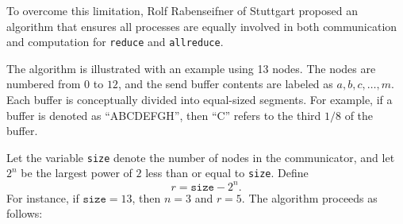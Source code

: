 \documentclass[12pt]{book}
\begin{document}
To overcome this limitation, Rolf Rabenseifner of Stuttgart proposed an algorithm 
that ensures all processes are equally involved in both communication and computation 
for \texttt{reduce} and \texttt{allreduce}.

The algorithm is illustrated with an example using 13 nodes. 
The nodes are numbered from $0$ to $12$, and the send buffer contents 
are labeled as $a,b,c,\ldots,m$. Each buffer is conceptually divided 
into equal-sized segments. For example, if a buffer is denoted as 
``ABCDEFGH'', then ``C'' refers to the third $1/8$ of the buffer.

Let the variable \texttt{size} denote the number of nodes in the communicator, 
and let $2^n$ be the largest power of $2$ less than or equal to \texttt{size}. 
Define 
\[
r = \texttt{size} - 2^n.
\]
For instance, if $\texttt{size} = 13$, then $n=3$ and $r=5$. The algorithm proceeds as follows:
\end{document}
